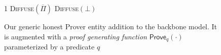 \begin{figure}[t]
\begin{algorithm}[H]
    \caption{\label{alg.backbone-prover} Our generic honest Prover entity addition to the
        backbone model. It is augmented with a{ \em
        proof generating function} $\textsf{Prove}_q(\cdot)$ parameterized by a
        predicate $q$}
    \begin{algorithmic}[1]
     \Statex
     \Let\chain\varepsilon
        \varepsilon
        1
                \State\textsc{Diffuse}{$(\overline \Pi)$}
            \Else
                \State\textsc{Diffuse}{$(\bot)$}
            \EndIf
        \EndWhile
        \vskip8pt
    \end{algorithmic}
\end{algorithm}
\end{figure}
